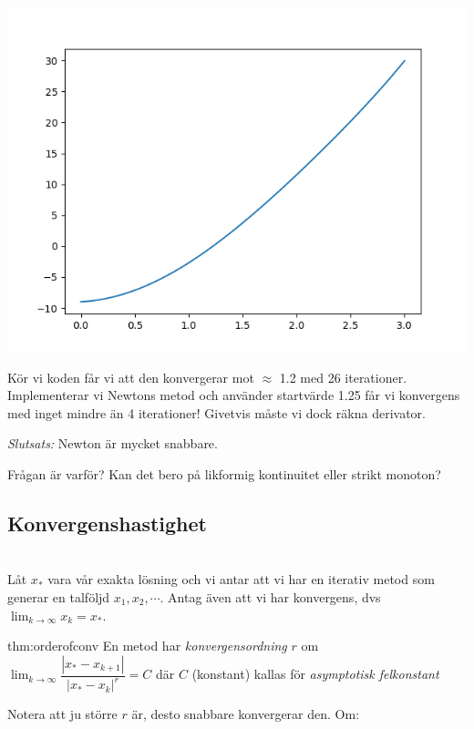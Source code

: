 \begin{center}
  \includegraphics{figures/Figure_1.png}
\end{center}

\pagebreak
\noindent Kör vi koden får vi att den konvergerar mot $\approx$ 1.2 med 26 iterationer. Implementerar vi Newtons metod och använder startvärde 1.25 får vi konvergens med inget mindre än 4 iterationer! Givetvis måste vi dock räkna derivator. 
\par\bigskip
\noindent \textit{Slutsats:} Newton är mycket snabbare.\par\noindent Frågan är varför? Kan det bero på likformig kontinuitet eller strikt monoton?
\par\bigskip

\subsection{Konvergenshastighet}\hfill\\

\noindent Låt $x_*$ vara vår exakta lösning och vi antar att vi har en iterativ metod som generar en talföljd $x_1, x_2, \cdots$. Antag även att vi har konvergens, dvs $\lim_{k\to\infty}x_k = x_*$.
\par\bigskip
\begin{theo}[Konvergensordning]{thm:orderofconv}
  En metod har \textit{konvergensordning} $r$ om $\lim_{k\to\infty}\dfrac{\left|x_*-x_{k+1}\right|}{\left|x_*-x_k\right|^r} = C$ där $C$ (konstant) kallas för \textit{asymptotisk felkonstant} 
\end{theo}
\par\bigskip
\noindent Notera att ju större $r$ är, desto snabbare konvergerar den. Om:

